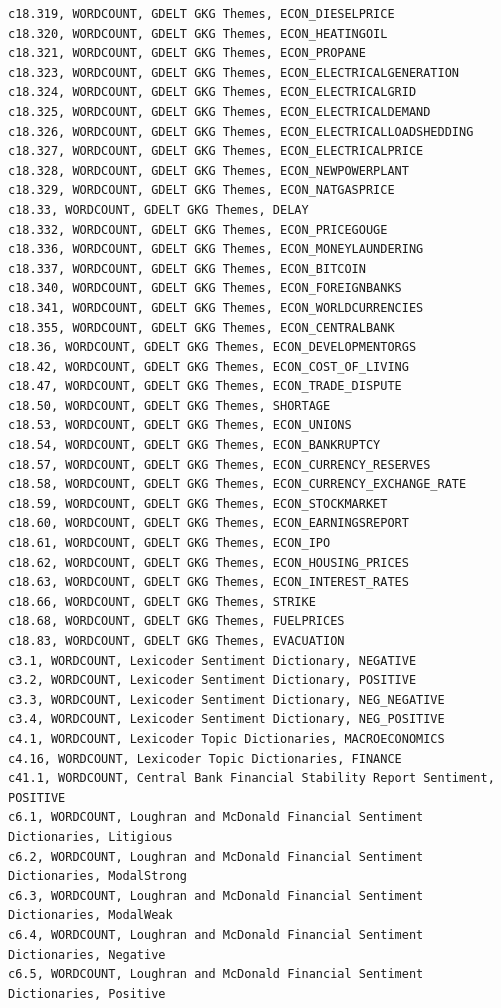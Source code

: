 \documentclass[12pt]{article}
\begin{document}
\begin{verbatim}
c18.319, WORDCOUNT, GDELT GKG Themes, ECON_DIESELPRICE
c18.320, WORDCOUNT, GDELT GKG Themes, ECON_HEATINGOIL
c18.321, WORDCOUNT, GDELT GKG Themes, ECON_PROPANE
c18.323, WORDCOUNT, GDELT GKG Themes, ECON_ELECTRICALGENERATION
c18.324, WORDCOUNT, GDELT GKG Themes, ECON_ELECTRICALGRID
c18.325, WORDCOUNT, GDELT GKG Themes, ECON_ELECTRICALDEMAND
c18.326, WORDCOUNT, GDELT GKG Themes, ECON_ELECTRICALLOADSHEDDING
c18.327, WORDCOUNT, GDELT GKG Themes, ECON_ELECTRICALPRICE
c18.328, WORDCOUNT, GDELT GKG Themes, ECON_NEWPOWERPLANT
c18.329, WORDCOUNT, GDELT GKG Themes, ECON_NATGASPRICE
c18.33, WORDCOUNT, GDELT GKG Themes, DELAY
c18.332, WORDCOUNT, GDELT GKG Themes, ECON_PRICEGOUGE
c18.336, WORDCOUNT, GDELT GKG Themes, ECON_MONEYLAUNDERING
c18.337, WORDCOUNT, GDELT GKG Themes, ECON_BITCOIN
c18.340, WORDCOUNT, GDELT GKG Themes, ECON_FOREIGNBANKS
c18.341, WORDCOUNT, GDELT GKG Themes, ECON_WORLDCURRENCIES
c18.355, WORDCOUNT, GDELT GKG Themes, ECON_CENTRALBANK
c18.36, WORDCOUNT, GDELT GKG Themes, ECON_DEVELOPMENTORGS
c18.42, WORDCOUNT, GDELT GKG Themes, ECON_COST_OF_LIVING
c18.47, WORDCOUNT, GDELT GKG Themes, ECON_TRADE_DISPUTE
c18.50, WORDCOUNT, GDELT GKG Themes, SHORTAGE
c18.53, WORDCOUNT, GDELT GKG Themes, ECON_UNIONS
c18.54, WORDCOUNT, GDELT GKG Themes, ECON_BANKRUPTCY
c18.57, WORDCOUNT, GDELT GKG Themes, ECON_CURRENCY_RESERVES
c18.58, WORDCOUNT, GDELT GKG Themes, ECON_CURRENCY_EXCHANGE_RATE
c18.59, WORDCOUNT, GDELT GKG Themes, ECON_STOCKMARKET
c18.60, WORDCOUNT, GDELT GKG Themes, ECON_EARNINGSREPORT
c18.61, WORDCOUNT, GDELT GKG Themes, ECON_IPO
c18.62, WORDCOUNT, GDELT GKG Themes, ECON_HOUSING_PRICES
c18.63, WORDCOUNT, GDELT GKG Themes, ECON_INTEREST_RATES
c18.66, WORDCOUNT, GDELT GKG Themes, STRIKE
c18.68, WORDCOUNT, GDELT GKG Themes, FUELPRICES
c18.83, WORDCOUNT, GDELT GKG Themes, EVACUATION
c3.1, WORDCOUNT, Lexicoder Sentiment Dictionary, NEGATIVE
c3.2, WORDCOUNT, Lexicoder Sentiment Dictionary, POSITIVE
c3.3, WORDCOUNT, Lexicoder Sentiment Dictionary, NEG_NEGATIVE
c3.4, WORDCOUNT, Lexicoder Sentiment Dictionary, NEG_POSITIVE
c4.1, WORDCOUNT, Lexicoder Topic Dictionaries, MACROECONOMICS
c4.16, WORDCOUNT, Lexicoder Topic Dictionaries, FINANCE
c41.1, WORDCOUNT, Central Bank Financial Stability Report Sentiment, POSITIVE
c6.1, WORDCOUNT, Loughran and McDonald Financial Sentiment Dictionaries, Litigious
c6.2, WORDCOUNT, Loughran and McDonald Financial Sentiment Dictionaries, ModalStrong
c6.3, WORDCOUNT, Loughran and McDonald Financial Sentiment Dictionaries, ModalWeak
c6.4, WORDCOUNT, Loughran and McDonald Financial Sentiment Dictionaries, Negative
c6.5, WORDCOUNT, Loughran and McDonald Financial Sentiment Dictionaries, Positive

\end{verbatim}
\end{document}
